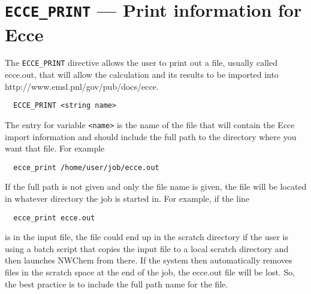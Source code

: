 \section{{\tt ECCE\_PRINT} --- Print information for Ecce}
\label{sec:ecce}

The \verb+ECCE_PRINT+ directive allows the user to print out a file,
usually called ecce.out, that will allow the calculation and its
results to be imported into 
{http://www.emsl.pnl/gov/pub/docs/ecce}.

\begin{verbatim}
  ECCE_PRINT <string name>
\end{verbatim}

The entry for variable \verb+<name>+ is the name of the file
that will contain the Ecce import information and should include
the full path to the directory where you want that file.  For example

\begin{verbatim}
  ecce_print /home/user/job/ecce.out
\end{verbatim}

If the full path is not given and only the file name is given, the file
will be located in whatever directory the job is started in.  For example,
if the line

\begin{verbatim}
  ecce_print ecce.out
\end{verbatim}

is in the input file, the file could end up in the scratch directory if
the user is using a batch script that copies the input file to a local
scratch directory and then launches NWChem from there.  If the system
then automatically removes files in the scratch space at the end of the
job, the ecce.out file will be lost.  So, the best
practice is to include the full path name for the file.



